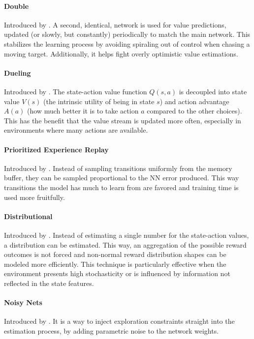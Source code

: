 \documentclass{article}
\begin{document}
\paragraph{Double} Introduced by \cite{double}. A second, identical, network is used for value predictions, updated (or slowly, but constantly) periodically to match the main network. This stabilizes the learning process by avoiding spiraling out of control when chasing a moving target. Additionally, it helps fight overly optimistic value estimations.

\paragraph{Dueling} Introduced by \cite{dueling15}. The state-action value function $Q(s, a)$ is decoupled into state value $V(s)$ (the intrinsic utility of being in state $s$) and action advantage $A(a)$ (how much better it is to take action $a$ compared to the other choices). This has the benefit that the value stream is updated more often, especially in environments where many actions are available. 

\paragraph{Prioritized Experience Replay} Introduced by \cite{per}. Instead of sampling transitions uniformly from the memory buffer, they can be sampled proportional to the NN error produced. This way transitions the model has much to learn from are favored and training time is used more fruitfully.

\paragraph{Distributional} Introduced by \cite{distributional}. Instead of estimating a single number for the state-action values, a distribution can be estimated. This way, an aggregation of the possible reward outcomes is not forced and non-normal reward distribution shapes can be modeled more efficiently. This technique is particularly effective when the environment presents high stochasticity or is influenced by information not reflected in the state features.

\paragraph{Noisy Nets} Introduced by \cite{noisy-nets}. It is a way to inject exploration constraints straight into the estimation process, by adding parametric noise to the network weights.
\end{document}
